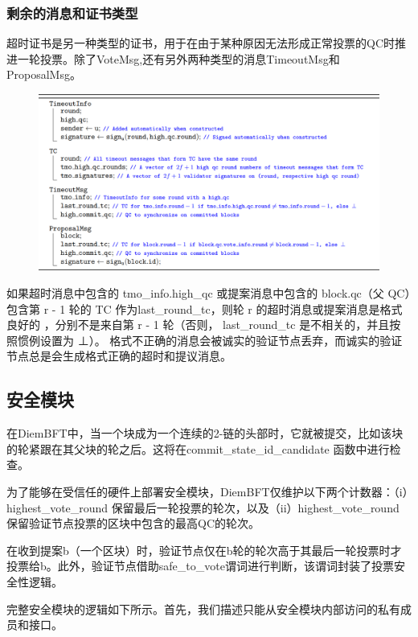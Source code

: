 \subsubsection{剩余的消息和证书类型}

超时证书是另一种类型的证书，用于在由于某种原因无法形成正常投票的QC时推进一轮投票。除了VoteMsg,还有另外两种类型的消息TimeoutMsg和ProposalMsg。

\begin{figure}[H]
    \centering
    \includegraphics[width=12cm]{figures/code5.png}
\end{figure}

如果超时消息中包含的 tmo\_info.high\_qc 或提案消息中包含的 block.qc（父 QC）包含第 r - 1 轮的 TC 作为last\_round\_tc，则轮 r 的超时消息或提案消息是格式良好的 ，分别不是来自第 r - 1 轮（否则， last\_round\_tc 是不相关的，并且按照惯例设置为 ⊥）。 格式不正确的消息会被诚实的验证节点丢弃，而诚实的验证节点总是会生成格式正确的超时和提议消息。

\subsection{安全模块}

在DiemBFT中，当一个块成为一个连续的2-链的头部时，它就被提交，比如该块的轮紧跟在其父块的轮之后。这将在commit\_state\_id\_candidate 函数中进行检查。

为了能够在受信任的硬件上部署安全模块，DiemBFT仅维护以下两个计数器：（i）highest\_vote\_round 保留最后一轮投票的轮次，以及（ii）highest\_vote\_round 保留验证节点投票的区块中包含的最高QC的轮次。

在收到提案b（一个区块）时，验证节点仅在b轮的轮次高于其最后一轮投票时才投票给b。此外，验证节点借助safe\_to\_vote谓词进行判断，该谓词封装了投票安全性逻辑。

完整安全模块的逻辑如下所示。首先，我们描述只能从安全模块内部访问的私有成员和接口。

